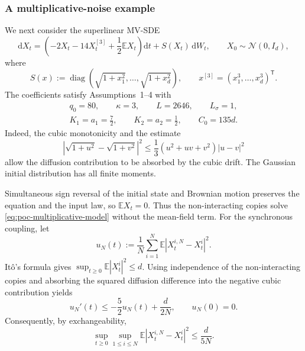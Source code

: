 \subsubsection{A multiplicative-noise example}
\label{subsec:poc-multiplicative}

We next consider the superlinear MV-SDE
\begin{equation}
\label{eq:poc-multiplicative-model}
    \mathrm dX_t
    =
    \left(-2X_t-14X_t^{[3]}+\frac12\mathbb EX_t\right)\mathrm dt
    +S(X_t)\,\mathrm dW_t,
    \qquad X_0\sim\mathcal N(0,I_d),
\end{equation}
where
\[
    S(x):=\operatorname{diag}
    \left(\sqrt{1+x_1^2},\ldots,\sqrt{1+x_d^2}\right),
    \qquad
    x^{[3]}=(x_1^3,\ldots,x_d^3)^{\mathsf T}.
\]
The coefficients satisfy Assumptions~1--4 with
\[
\begin{gathered}
    q_0=80,\qquad \kappa=3,\qquad L=2646,\qquad L_\sigma=1,\\
    K_1=a_1=\frac72,\qquad K_2=a_2=\frac12,\qquad C_0=135d.
\end{gathered}
\]
Indeed, the cubic monotonicity and the estimate
\[
    \left|\sqrt{1+u^2}-\sqrt{1+v^2}\right|^2
    \le\frac13(u^2+uv+v^2)|u-v|^2
\]
allow the diffusion contribution to be absorbed by the cubic drift.
The Gaussian initial distribution has all finite moments.

Simultaneous sign reversal of the initial state and Brownian motion
preserves the equation and the input law, so \(\mathbb EX_t=0\). Thus the non-interacting copies solve
\eqref{eq:poc-multiplicative-model} without the mean-field term.
For the synchronous coupling, let
\[
    u_N(t):=\frac1N\sum_{i=1}^N
    \mathbb E|X_t^{i,N}-X_t^i|^2.
\]
It\^o's formula gives \(\sup_{t\ge0}\mathbb E|X_t^i|^2\le d\).
Using independence of the non-interacting copies and absorbing the
squared diffusion difference into the negative cubic contribution yields
\[
    u_N'(t)\le-\frac52u_N(t)+\frac{d}{2N},\qquad u_N(0)=0.
\]
Consequently, by exchangeability,
\begin{equation}
\label{eq:poc-multiplicative-bound}
    \sup_{t\ge0}\sup_{1\le i\le N}
    \mathbb E|X_t^{i,N}-X_t^i|^2
    \le\frac{d}{5N}.
\end{equation}

